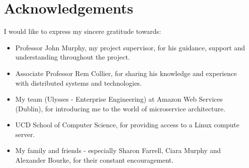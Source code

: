 \chapter*{Acknowledgements}

I would like to express my sincere gratitude towards:
\begin{itemize}
  \item Professor John Murphy, my project supervisor, for his guidance, support and understanding throughout the project.
  \item Associate Professor Rem Collier, for sharing his knowledge and experience with distributed systems and technologies.
  \item My team (Ulysses - Enterprise Engineering) at Amazon Web Services (Dublin), for introducing me to the world of microservice architecture.
  \item UCD School of Computer Science, for providing access to a Linux compute server.
  \item My family and friends - especially Sharon Farrell, Ciara Murphy and Alexander Bourke, for their constant encouragement.
\end{itemize}
